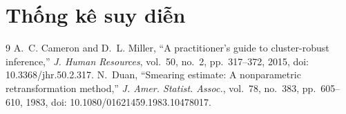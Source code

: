 \documentclass[12pt,a4paper]{article}
\begin{document}
\setcounter{section}{4}
\section{Thống kê suy diễn}
\setcounter{subsection}{1}


\begin{thebibliography}{9}
   A.~C. Cameron and D.~L. Miller, ``A practitioner's guide to
    cluster-robust inference,'' \emph{J. Human Resources}, vol.~50, no.~2, pp.~317--372,
    2015, doi: 10.3368/jhr.50.2.317.
   N.~Duan, ``Smearing estimate: A nonparametric retransformation
    method,'' \emph{J. Amer. Statist. Assoc.}, vol.~78, no.~383, pp.~605--610, 1983,
    doi: 10.1080/01621459.1983.10478017.
\end{thebibliography}
\end{document}
